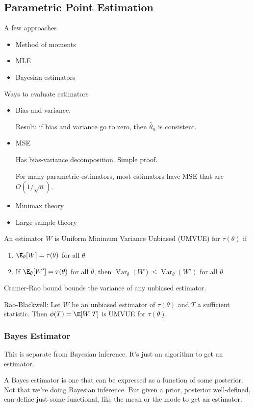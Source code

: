 \documentclass[12pt]{article}
\theoremstyle{plain}
\theoremstyle{definition}
\theoremstyle{remark}
\newcommand{\Var}{\operatorname{Var}}
\begin{document}
\subsection{Parametric Point Estimation}

A few approaches
\begin{itemize}
  \item Method of moments
  \item MLE
  \item Bayesian estimators
\end{itemize}
Ways to evaluate estimators
\begin{itemize}
  \item Bias and variance.

    Result: if bias and variance go to zero, then $\hat{\theta}_n$ is
    consistent.

  \item MSE

    Has bias-variance decomposition.
    Simple proof.

    For many parametric estimators, most estimators have MSE that are
    $O(1/\sqrt{n})$.

  \item Minimax theory
  \item Large sample theory
\end{itemize}
An estimator $W$ is Uniform Minimum Variance Unbiased (UMVUE) for
$\tau(\theta)$ if
\begin{enumerate}
  \item $\E_\theta[W]=\tau(\theta)$ for all $\theta$
  \item If $\E_\theta[W']=\tau(\theta)$ for all $\theta$, then
    $\Var_\theta(W)\leq \Var_\theta(W')$ for all $\theta$.
\end{enumerate}
Cramer-Rao bound bounds the variance of any unbiased estimator.

Rao-Blackwell:
Let $W$ be an unbiased estimator of $\tau(\theta)$ and $T$ a sufficient
statistic.
Then $\phi(T)=\E[W|T]$ is UMVUE for $\tau(\theta)$.



\subsubsection{Bayes Estimator}

This is separate from Bayesian inference. It's just an algorithm to get
an estimator.

A Bayes estimator is one that can be expressed as a function of some
posterior.
Not that we're doing Bayesian inference.
But given a prior, posterior well-defined, can define just some
functional, like the mean or the mode to get an estimator.
\end{document}
